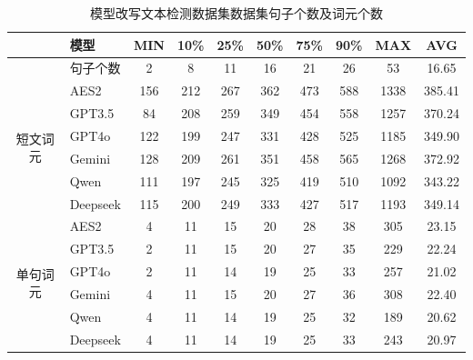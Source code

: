\begin{table}[htbp]
\centering

\caption{模型改写文本检测数据集数据集句子个数及词元个数}
\begin{tabular}{c|l|cccccccc}
\toprule
                          & \textbf{模型}  & \textbf{MIN} & \textbf{10\%} & \textbf{25\%} & \textbf{50\%} & \textbf{75\%} & \textbf{90\%} & \textbf{MAX}  & \textbf{AVG}   \\
    \midrule
                          & 句子个数        & 2   & 8    & 11   & 16   & 21   & 26   & 53   & 16.65  \\ \midrule
\multirow{6}{*}{短文词元} & AES2            & 156 & 212  & 267  & 362  & 473  & 588  & 1338 & 385.41 \\
                          & GPT3.5          & 84  & 208  & 259  & 349  & 454  & 558  & 1257 & 370.24 \\
                          & GPT4o           & 122 & 199  & 247  & 331  & 428  & 525  & 1185 & 349.90 \\
                          & Gemini          & 128 & 209  & 261  & 351  & 458  & 565  & 1268 & 372.92 \\
                          & Qwen            & 111 & 197  & 245  & 325  & 419  & 510  & 1092 & 343.22 \\
                          & Deepseek        & 115 & 200  & 249  & 333  & 427  & 517  & 1193 & 349.14 \\
                          \midrule
\multirow{6}{*}{单句词元} & AES2            & 4   & 11   & 15   & 20   & 28   & 38   & 305  & 23.15  \\
                          & GPT3.5          & 2   & 11   & 15   & 20   & 27   & 35   & 229  & 22.24  \\
                          & GPT4o           & 2   & 11   & 14   & 19   & 25   & 33   & 257  & 21.02  \\
                          & Gemini          & 4   & 11   & 15   & 20   & 27   & 36   & 308  & 22.40  \\
                          & Qwen            & 4   & 11   & 14   & 19   & 25   & 32   & 189  & 20.62  \\
                          & Deepseek        & 4   & 11   & 14   & 19   & 25   & 33   & 243  & 20.97 \\
                          \bottomrule
\end{tabular}

\label{tab:TOSWT-length}

\end{table}

